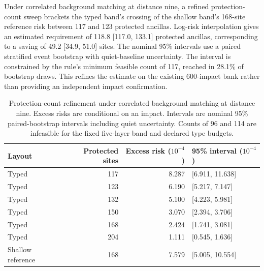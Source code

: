 Under correlated background matching at distance nine, a refined protection-count sweep brackets the typed band's crossing of the shallow band's 168-site reference risk between 117 and 123 protected ancillas. Log-risk interpolation gives an estimated requirement of 118.8 [117.0, 133.1] protected ancillas, corresponding to a saving of 49.2 [34.9, 51.0] sites. The nominal 95\% intervals use a paired stratified event bootstrap with quiet-baseline uncertainty. The interval is constrained by the rule's minimum feasible count of 117, reached in 28.1\% of bootstrap draws. This refines the estimate on the existing 600-impact bank rather than providing an independent impact confirmation.

\begin{table}[t]
\centering\small
\caption{Protection-count refinement under correlated background matching at distance nine. Excess risks are conditional on an impact. Intervals are nominal 95\% paired-bootstrap intervals including quiet uncertainty. Counts of 96 and 114 are infeasible for the fixed five-layer band and declared type budgets.}
\label{tab:count-refinement}
\begin{tabular}{@{}lrrl@{}}\toprule
Layout & Protected sites & Excess risk ($10^{-4}$) & 95\% interval ($10^{-4}$)\\\midrule
Typed & 117 & 8.287 & [6.911, 11.638]\\
Typed & 123 & 6.190 & [5.217, 7.147]\\
Typed & 132 & 5.100 & [4.223, 5.981]\\
Typed & 150 & 3.070 & [2.394, 3.706]\\
Typed & 168 & 2.424 & [1.741, 3.081]\\
Typed & 204 & 1.111 & [0.545, 1.636]\\
Shallow reference & 168 & 7.579 & [5.005, 10.554]\\\bottomrule
\end{tabular}\end{table}
